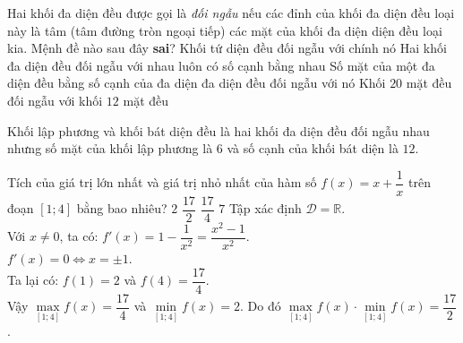 \begin{ex}%
 Hai khối đa diện đều được gọi là \textit{đối ngẫu} nếu các đỉnh của khối đa diện đều loại này là tâm (tâm đường tròn ngoại tiếp) các mặt của khối đa diện diện đều loại kia. Mệnh đề nào sau đây \textbf{sai}?
 \choice
  {Khối tứ diện đều đối ngẫu với chính nó}
  {Hai khối đa diện đều đối ngẫu với nhau luôn có số cạnh bằng nhau}
  {\True Số mặt của một đa diện đều bằng số cạnh của đa diện đa diện đều đối ngẫu với nó}
  {Khối $20$ mặt đều đối ngẫu với khối $12$ mặt đều}
 \loigiai
  {
  \immini
  {
  Khối lập phương và khối bát diện đều là hai khối đa diện đều đối ngẫu nhau nhưng số mặt của khối lập phương là $6$ và số cạnh của khối bát diện là $12$.
  }
  {
  }
  
  }
\end{ex}


\begin{ex}%
 Tích của giá trị lớn nhất và giá trị nhỏ nhất của hàm số $f(x) = x + \dfrac{1}{x}$ trên đoạn $[1;4]$ bằng bao nhiêu?
 \choice
  {$2$}
  {\True $\dfrac{17}{2}$}
  {$\dfrac{17}{4}$}
  {$7$}
 \loigiai
  {
  Tập xác định $\mathscr{D} = \mathbb{R}$.\\
  Với $x \neq 0$, ta có: $f'(x) = 1 - \dfrac{1}{x^2} = \dfrac{x^2 - 1}{x^2}$.\\
  $f'(x) = 0 \Leftrightarrow x = \pm 1$.\\
  Ta lại có: $f(1) = 2$ và $f(4) = \dfrac{17}{4}$.\\
  Vậy $\max\limits_{[1;4]} f(x) = \dfrac{17}{4}$ và $\min\limits_{[1;4]} f(x) = 2$. Do đó $\max\limits_{[1;4]} f(x) \cdot \min\limits_{[1;4]} f(x) = \dfrac{17}{2}$.
  }
\end{ex}


